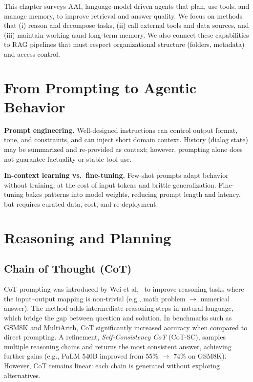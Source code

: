 \label{chap:State_of_Art}
\cleardoublepage

This chapter surveys \gls{AAI}, language-model driven agents that plan, use tools, and manage memory, to improve retrieval and answer quality. We focus on methods that (i) reason and decompose tasks, (ii) call external tools and data sources, and (iii) maintain working åand long-term memory. We also connect these capabilities to \gls{RAG} pipelines that must respect organizational structure (folders, metadata) and access control.

\section{From Prompting to Agentic Behavior}
\textbf{Prompt engineering.} Well-designed instructions can control output format, tone, and constraints, and can inject short domain context. History (dialog state) may be summarized and re-provided as context; however, prompting alone does not guarantee factuality or stable tool use.

\textbf{In-context learning vs.\ fine-tuning.} Few-shot prompts adapt behavior without training, at the cost of input tokens and brittle generalization. Fine-tuning bakes patterns into model weights, reducing prompt length and latency, but requires curated data, cost, and re-deployment.

\section{Reasoning and Planning}
\subsection{Chain of Thought (CoT)}
CoT prompting was introduced by Wei et al.~\cite{chainofthought} to improve reasoning tasks where the input–output mapping is non-trivial (e.g., math problem $\to$ numerical answer). The method adds intermediate reasoning steps in natural language, which bridge the gap between question and solution.
In benchmarks such as GSM8K and MultiArith, CoT significantly increased accuracy when compared to direct prompting. A refinement, \emph{Self-Consistency CoT} (CoT-SC), samples multiple reasoning chains and returns the most consistent answer, achieving further gains (e.g., PaLM 540B improved from 55\% $\to$ 74\% on GSM8K). However, CoT remains linear: each chain is generated without exploring alternatives.

